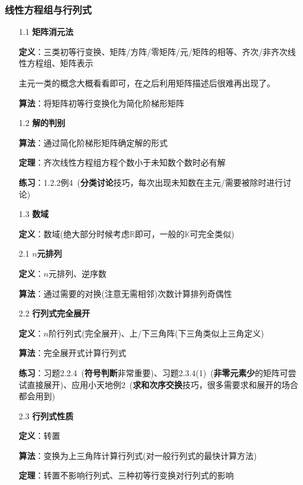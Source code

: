 \documentclass[a4paper,UTF8,fontset=windows]{ctexart}
\newcommand*{\note}{\noindent *}
\begin{document}
\subsubsection{线性方程组与行列式}
\begin{enumerate}
    \item[1.1] \textbf{矩阵消元法}
    
    \textbf{定义}：三类初等行变换、矩阵/方阵/零矩阵/元/矩阵的相等、齐次/非齐次线性方程组、矩阵表示

    \note 主元一类的概念大概看看即可，在之后利用矩阵描述后很难再出现了。

    \textbf{算法}：将矩阵初等行变换化为简化阶梯形矩阵
    
    \item[1.2] \textbf{解的判别}
    
    \textbf{算法}：通过简化阶梯形矩阵确定解的形式

    \textbf{定理}：齐次线性方程组方程个数小于未知数个数时必有解

    \textbf{练习}：1.2.2例4\ (\textbf{分类讨论}技巧，每次出现未知数在主元/需要被除时进行讨论)

    \item[1.3] \textbf{数域}
    
    \textbf{定义}：数域(绝大部分时候考虑$\mathbb{R}$即可，一般的$\mathbb{K}$可完全类似)

    \item[2.1] \textbf{$n$元排列}
    
    \textbf{定义}：$n$元排列、逆序数

    \textbf{算法}：通过需要的对换(注意无需相邻)次数计算排列奇偶性

    \item[2.2] \textbf{行列式完全展开}
    
    \textbf{定义}：$n$阶行列式(完全展开)、上/下三角阵(下三角类似上三角定义)

    \textbf{算法}：完全展开式计算行列式

    \textbf{练习}：习题2.2.4\ (\textbf{符号判断}非常重要)、习题2.3.4(1)\ (\textbf{非零元素少}的矩阵可尝试直接展开)、应用小天地例2\ (\textbf{求和次序交换}技巧，很多需要求和展开的场合都会用到)

    \item[2.3] \textbf{行列式性质}

    \textbf{定义}：转置

    \textbf{算法}：变换为上三角阵计算行列式(对一般行列式的最快计算方法)

    \textbf{定理}：转置不影响行列式、三种初等行变换对行列式的影响


\end{enumerate}
\end{document}

